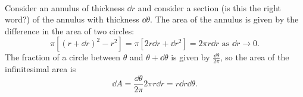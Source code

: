\documentclass[../multivariate_calculus.tex]{subfiles}
\begin{document}
        \paragraph{}
        Consider an annulus of thickness $\dd{r}$ and consider a section (is this the right word?) of the annulus with thickness $\dd{\theta}$.
        The area of the annulus is given by the difference in the area of two circles:
        \begin{equation}
            \pi[(r+\dd{r})^2-r^2]=\pi[2r\dd{r}+\dd{r}^2]=2\pi r\dd{r}\text{ as }\dd{r}\to 0.
        \end{equation}
        The fraction of a circle between $\theta$ and $\theta+\dd{\theta}$ is given by $\frac{\dd{\theta}}{2\pi}$, so the area of the infinitesimal area is
        \begin{equation}
            \dd{A}=\frac{\dd{\theta}}{2\pi}2\pi r\dd{r}=r\dd{r}\dd{\theta}.
        \end{equation}
\end{document}
